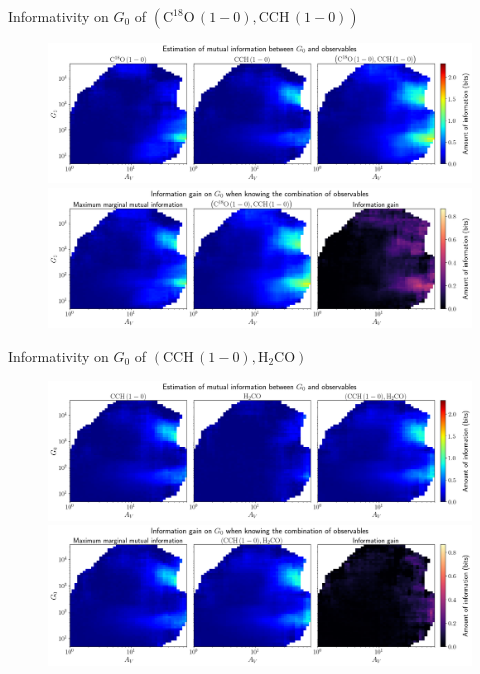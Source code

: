 \documentclass{beamer}
\begin{document}
\begin{frame}{Informativity on $G_0$ of $\left(\mathrm{C^{18}O\,(1-0)},\mathrm{CCH\,(1-0)}\right)$}
    \begin{figure}
        \centering
        \includegraphics[width=0.95\linewidth]{../mi/g0__c18o10_cch10_mi.png}
        \vfill
        \includegraphics[width=0.95\linewidth]{../mi/g0__c18o10_cch10_mi_gain.png}
    \end{figure}
\end{frame}

\begin{frame}{Informativity on $G_0$ of $\left(\mathrm{CCH\,(1-0)},\mathrm{H_2CO}\right)$}
    \begin{figure}
        \centering
        \includegraphics[width=0.95\linewidth]{../mi/g0__cch10_h2co_mi.png}
        \vfill
        \includegraphics[width=0.95\linewidth]{../mi/g0__cch10_h2co_mi_gain.png}
    \end{figure}
\end{frame}
\end{document}
